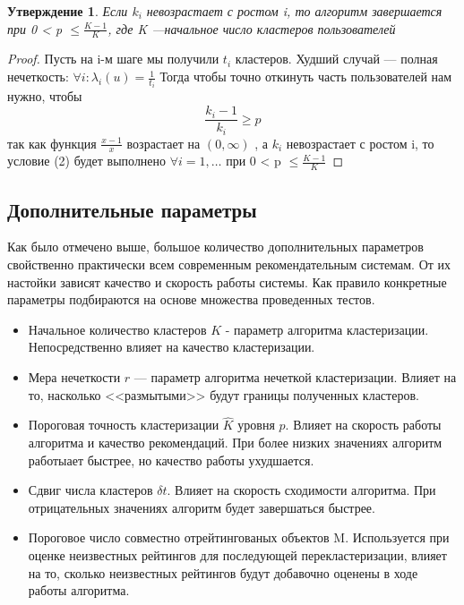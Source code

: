 \documentclass[a4paper, 12pt]{article} %
\newtheorem{statement}{Утверждение}
\begin{document}
\begin{statement}
Если $k_{i} $ невозрастает с ростом i, то алгоритм завершается при   0 < p $\leq \frac {K - 1}{K}$, где K ---начальное число кластеров пользователей
\end{statement}
\begin{proof}

Пусть на i-м шаге мы получили $t_{i}$ кластеров. 
Худший случай --- полная нечеткость: $\forall i: \lambda_{i}(u) = \frac{1}{t_{i}}$
Тогда чтобы точно откинуть часть пользователей нам нужно, чтобы 
\begin{equation}
	\frac{k_{i} - 1}{k_{i}} \geq p
\end{equation}
так как функция $\frac{x-1}{x}$ возрастает на $(0, \infty)$ , а $k_{i} $ невозрастает с ростом i,  то  условие (2) будет выполнено $\forall i = 1,\dots$ при 0 < p $\leq \frac {K - 1}{K}$
\end{proof}

\subsection{Дополнительные параметры}

Как было отмечено выше, большое количество дополнительных параметров свойственно практически всем современным рекомендательным системам. От их настойки зависят качество и скорость работы системы. Как правило конкретные параметры подбираются на основе множества проведенных тестов. 

\begin{itemize}
\item Начальное количество кластеров $K$ - параметр алгоритма кластеризации. Непосредственно влияет на качество кластеризации. 
\item Мера нечеткости $r$ --- параметр алгоритма нечеткой кластеризации. Влияет на то, насколько <<размытыми>> будут границы полученных кластеров.
\item Пороговая точность кластеризации $\hat{K}$ уровня $p$. Влияет на скорость работы алгоритма и качество рекомендаций. При более низких значениях алгоритм работыает быстрее, но качество работы ухудшается.
\item Сдвиг числа кластеров $\delta t$. Влияет на скорость сходимости алгоритма. При отрицательных значениях алгоритм будет завершаться быстрее.
\item Пороговое число совместно отрейтингованых объектов M. Используется при оценке неизвестных рейтингов для последующей перекластеризации, влияет на то, сколько неизвестных рейтингов будут добавочно оценены в ходе работы алгоритма\cite{itercf}.

\end{itemize}
\end{document}
